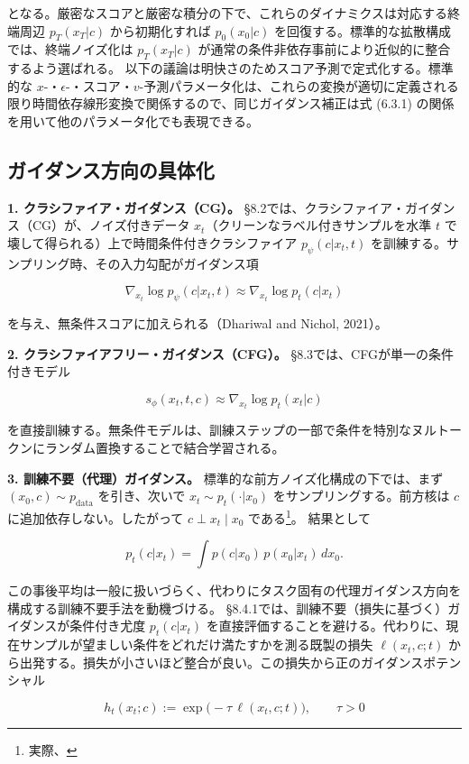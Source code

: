 となる。厳密なスコアと厳密な積分の下で、これらのダイナミクスは対応する終端周辺 $p_T(x_T|c)$ から初期化すれば $p_0(x_0|c)$ を回復する。標準的な拡散構成では、終端ノイズ化は $p_T(x_T|c)$ が通常の条件非依存事前により近似的に整合するよう選ばれる。
以下の議論は明快さのためスコア予測で定式化する。標準的な $x$-・$\epsilon$-・スコア・$v$-予測パラメータ化は、これらの変換が適切に定義される限り時間依存線形変換で関係するので、同じガイダンス補正は式 (6.3.1) の関係を用いて他のパラメータ化でも表現できる。

\subsection*{ガイダンス方向の具体化}


\textbf{1. クラシファイア・ガイダンス（CG）。} §8.2では、クラシファイア・ガイダンス（CG）が、ノイズ付きデータ $x_t$（クリーンなラベル付きサンプルを水準 $t$ で壊して得られる）上で時間条件付きクラシファイア $p_\psi(c|x_t,t)$ を訓練する。サンプリング時、その入力勾配がガイダンス項

\[
\nabla_{x_t}\log p_\psi(c|x_t,t)\approx\nabla_{x_t}\log p_t(c|x_t)
\]


を与え、無条件スコアに加えられる（Dhariwal and Nichol, 2021）。

\textbf{2. クラシファイアフリー・ガイダンス（CFG）。} §8.3では、CFGが単一の条件付きモデル

\[
s_\phi(x_t,t,c)\approx\nabla_{x_t}\log p_t(x_t|c)
\]


を直接訓練する。無条件モデルは、訓練ステップの一部で条件を特別なヌルトークンにランダム置換することで結合学習される。

\textbf{3. 訓練不要（代理）ガイダンス。} 標準的な前方ノイズ化構成の下では、まず $(x_0,c)\sim p_{\mathrm{data}}$ を引き、次いで $x_t\sim p_t(\cdot|x_0)$ をサンプリングする。前方核は $c$ に追加依存しない。したがって $c\perp x_t\mid x_0$ である\footnote{実際、}。
結果として

\[
p_t(c|x_t)=\int p(c|x_0)\,p(x_0|x_t)\,dx_0.
\]


この事後平均は一般に扱いづらく、代わりにタスク固有の代理ガイダンス方向を構成する訓練不要手法を動機づける。
§8.4.1では、訓練不要（損失に基づく）ガイダンスが条件付き尤度 $p_t(c|x_t)$ を直接評価することを避ける。代わりに、現在サンプルが望ましい条件をどれだけ満たすかを測る既製の損失 $\ell(x_t,c;t)$ から出発する。損失が小さいほど整合が良い。この損失から正のガイダンスポテンシャル

\[
h_t(x_t;c):=\exp\bigl(-\tau\,\ell(x_t,c;t)\bigr),\qquad\tau>0
\]



